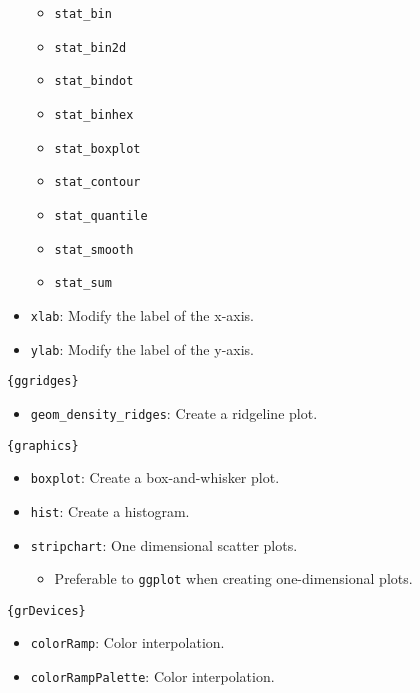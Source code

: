 \documentclass[]{book}
\providecommand{\tightlist}{%
  \setlength{\itemsep}{0pt}\setlength{\parskip}{0pt}}
\begin{document}
\begin{itemize}
  \begin{itemize}
  \tightlist
  \item
    \texttt{stat\_bin}
  \item
    \texttt{stat\_bin2d}
  \item
    \texttt{stat\_bindot}
  \item
    \texttt{stat\_binhex}
  \item
    \texttt{stat\_boxplot}
  \item
    \texttt{stat\_contour}
  \item
    \texttt{stat\_quantile}
  \item
    \texttt{stat\_smooth}
  \item
    \texttt{stat\_sum}
  \end{itemize}
\item
  \texttt{xlab}: Modify the label of the x-axis.
\item
  \texttt{ylab}: Modify the label of the y-axis.
\end{itemize}

\texttt{\{ggridges\}}

\begin{itemize}
\tightlist
\item
  \texttt{geom\_density\_ridges}: Create a ridgeline plot.
\end{itemize}

\texttt{\{graphics\}}

\begin{itemize}
\tightlist
\item
  \texttt{boxplot}: Create a box-and-whisker plot.
\item
  \texttt{hist}: Create a histogram.
\item
  \texttt{stripchart}: One dimensional scatter plots.

  \begin{itemize}
  \tightlist
  \item
    Preferable to \texttt{ggplot} when creating one-dimensional plots.
  \end{itemize}
\end{itemize}

\texttt{\{grDevices\}}

\begin{itemize}
\tightlist
\item
  \texttt{colorRamp}: Color interpolation.
\item
  \texttt{colorRampPalette}: Color interpolation.
\end{itemize}
\end{document}
